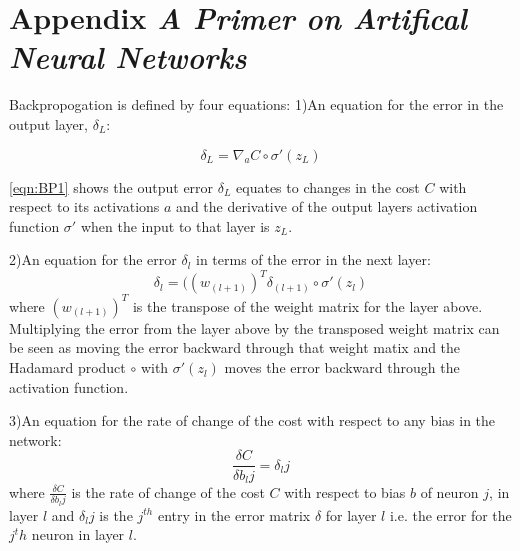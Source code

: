 \chapter{Appendix \emph{A Primer on Artifical Neural Networks}}
\label{appendix:app3}


Backpropogation is defined by four equations:
1)An equation for the error in the output layer, $\delta_L$:

\begin{equation} \label{eqn:BP1}
\delta_L = \nabla_a C \circ \sigma'(z_L)
\end{equation}

\autoref{eqn:BP1} shows the output error $\delta_L$ equates to changes in the cost $C$ with respect to its activations $a$ and the derivative of the output layers activation function $\sigma'$ when the input to that layer is $z_L$.

2)An equation for the error $\delta_l$ in terms of the error in the next layer:
\begin{equation} \label{eqn:BP2}
\delta_l = ((w_{(l+1)})^T\delta_{(l+1)} \circ \sigma'(z_l)
\end{equation}
where $(w_{(l+1)})^T$ is the transpose of the weight matrix for the layer above. Multiplying the error from the layer above by the transposed weight matrix can be seen as moving the error backward through that weight matix and the Hadamard product $\circ$ with $\sigma'(z_l)$ moves the error backward through the activation function.

3)An equation for the rate of change of the cost with respect to any bias in the network:
\begin{equation} \label{eqn:BP3}
\frac{\delta C}{\delta b_lj} = \delta_lj
\end{equation}
where $\frac{\delta C}{\delta b_lj}$ is the rate of change of the cost $C$ with respect to bias $b$ of neuron $j$, in layer $l$ and $\delta_lj$ is the $j^{th}$ entry in the error matrix $\delta$ for layer $l$ i.e. the error for the $j^th$ neuron in layer $l$.

